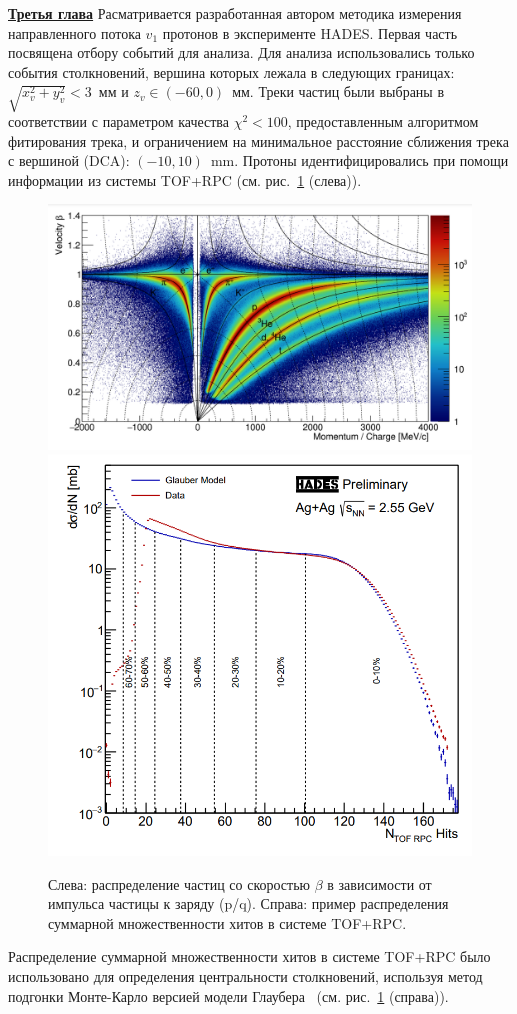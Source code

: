 %


\underline{\textbf{Третья глава}} Расматривается разработанная автором методика измерения направленного потока $v_1$ протонов
в эксперименте HADES. Первая часть посвящена отбору событий для анализа. 
Для анализа использовались только события столкновений, вершина которых лежала в следующих границах: $\sqrt{x_v^2+y_v^2}<3$~мм и $z_v \in (-60, 0)$~мм.
 Треки частиц были выбраны в
соответствии с параметром качества $\chi^2<100$, предоставленным алгоритмом фитирования трека, и ограничением на минимальное расстояние сближения трека с вершиной (DCA): $(-10,10)$~mm. Протоны идентифицировались при помощи информации из системы  TOF+RPC (см. рис.~\ref{fig:hades_pid} (слева)).

\begin{figure}[h]
\begin{center}
  \includegraphics[width=0.55\linewidth]{images/hades_pid_plot.png}
  \includegraphics[width=0.35\linewidth]{images/hades_mult.png}
  \caption{ Слева: распределение частиц со скоростью $\beta$  в зависимости от  импульса частицы к заряду
    (p/q). Справа: пример распределения суммарной множественности хитов в системе TOF+RPC.}
\label{fig:hades_pid}
\end{center}
\end{figure}

Распределение суммарной множественности хитов в системе TOF+RPC было использовано для определения центральности столкновений, используя метод 
подгонки Монте-Карло версией модели Глаубера ~\cite{HADES:2017def}(см. рис.~\ref{fig:hades_pid} (справа)).






